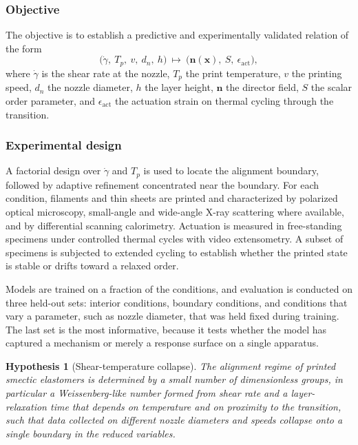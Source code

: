 \documentclass[11pt]{article}
\newtheorem{hypothesis}{Hypothesis}
\theoremstyle{definition}
\begin{document}
\subsubsection*{Objective}

The objective is to establish a predictive and experimentally validated relation of the form
\begin{equation}
\bigl(\dot\gamma,\ T_p,\ v,\ d_n,\ h\bigr)\ \longmapsto\ \bigl(\mathbf{n}(\mathbf{x}),\ S,\ \epsilon_{\mathrm{act}}\bigr),
\end{equation}
where $\dot\gamma$ is the shear rate at the nozzle, $T_p$ the print temperature, $v$ the printing speed, $d_n$ the nozzle diameter, $h$ the layer height, $\mathbf{n}$ the director field, $S$ the scalar order parameter, and $\epsilon_{\mathrm{act}}$ the actuation strain on thermal cycling through the transition.

\subsubsection*{Experimental design}

A factorial design over $\dot\gamma$ and $T_p$ is used to locate the alignment boundary, followed by adaptive refinement concentrated near the boundary. For each condition, filaments and thin sheets are printed and characterized by polarized optical microscopy, small-angle and wide-angle X-ray scattering where available, and by differential scanning calorimetry. Actuation is measured in free-standing specimens under controlled thermal cycles with video extensometry. A subset of specimens is subjected to extended cycling to establish whether the printed state is stable or drifts toward a relaxed order.

Models are trained on a fraction of the conditions, and evaluation is conducted on three held-out sets: interior conditions, boundary conditions, and conditions that vary a parameter, such as nozzle diameter, that was held fixed during training. The last set is the most informative, because it tests whether the model has captured a mechanism or merely a response surface on a single apparatus.

\begin{hypothesis}[Shear-temperature collapse]
\label{hyp:collapse}
The alignment regime of printed smectic elastomers is determined by a small number of dimensionless groups, in particular a Weissenberg-like number formed from shear rate and a layer-relaxation time that depends on temperature and on proximity to the transition, such that data collected on different nozzle diameters and speeds collapse onto a single boundary in the reduced variables.
\end{hypothesis}
\end{document}
